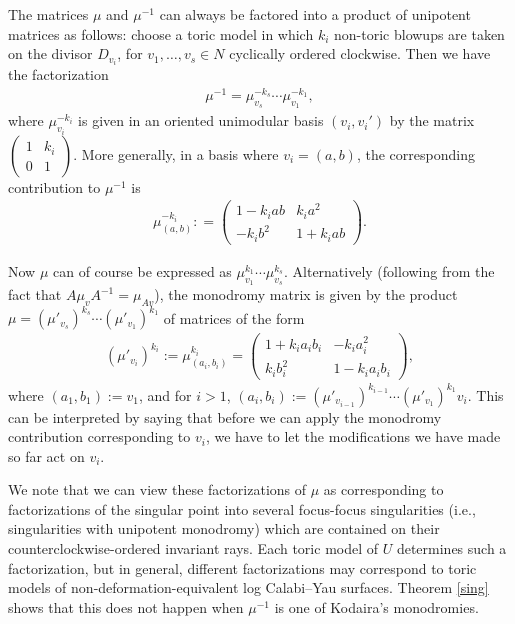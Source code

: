 The matrices $\mu$ and $\mu^{-1}$ can always be factored into a product of unipotent matrices as follows: choose a toric model in which $k_i$ non-toric blowups are taken on the divisor $D_{v_i}$, for $v_1,\dots,v_s\in N$ cyclically ordered clockwise. Then we have the factorization
\begin{align}
	\mu^{-1} = \mu_{v_s}^{-k_s} \cdots \mu_{v_1}^{-k_1},
\end{align}
where $\mu_{v_i}^{-k_i}$ is given in an oriented unimodular basis $(v_i,v_i')$ by the matrix $	\left(\begin{smallmatrix}
		1 &k_i \\
		0 &1
		\end{smallmatrix}\right)$.
 More generally, in a basis where $v_i = (a,b)$, the corresponding contribution to $\mu^{-1}$ is
\begin{gather}\label{genmut}
	\mu_{(a,b)}^{-k_i} :
		= \left(\begin{matrix}
		1- k_i a b &k_i a^2 \\
		-k_i b^2 &1+k_i a b
		\end{matrix}\right).
\end{gather}

Now $\mu$ can of course be expressed as $\mu_{v_1}^{k_1} \cdots \mu_{v_s}^{k_s}$. Alternatively (following from the fact that $A\mu_v A^{-1}=\mu_{Av}$), the monodromy matrix is given by the product $\mu=(\mu'_{v_s})^{k_s} \cdots (\mu'_{v_1})^{k_1}$ of matrices of the form
\begin{align}\label{hardmu}
	(\mu'_{v_i})^{k_i}:=\mu_{(a_i,b_i)}^{k_i}
		= \left(\begin{matrix}
		1+ k_i a_i b_i &-k_i a_i^2 \\
		k_i b_i^2 &1-k_i a_i b_i
		\end{matrix}\right),
\end{align}
where $(a_1,b_1):=v_1$, and for $i>1$, $(a_i,b_i):=(\mu'_{v_{i-1}})^{k_{i-1}}\cdots (\mu'_{v_1})^{k_1} v_i$. This can be interpreted by saying that before we can apply the monodromy contribution corresponding to $v_i$, we have to let the modifications we have made so far act on $v_i$.

\begin{rmk}\label{factor}We note that we can view these factorizations of $\mu$ as corresponding to factorizations of the singular point into several focus-focus singularities (i.e., singularities with unipotent monodromy) which are contained on their counterclockwise-ordered invariant rays. Each toric model of $U$ determines such a factorization, but in general, different factorizations may correspond to toric models of non-deformation-equivalent log Calabi--Yau surfaces. Theorem \ref{sing} shows that this does not happen when $\mu^{-1}$ is one of Kodaira's monodromies.
\end{rmk}

